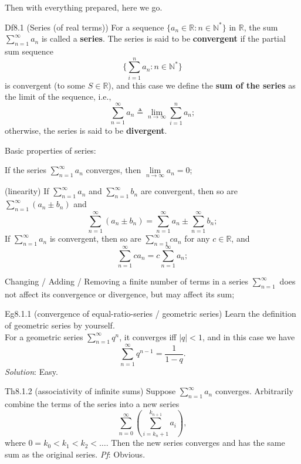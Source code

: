 \documentclass{article}
\begin{document}
Then with everything prepared, here we go. 

\begin{Df}{Df8.1 (Series (of real terms))}
    For a sequence $\{a_n\in\mathbb{R}: n\in\mathbb{N}^\ast\}$ in $\mathbb{R}$, the sum $\sum_{n=1}^{\infty} a_n$ is called a \textbf{series}. The series is said to be \textbf{convergent} if the \textcolor{Df}{partial sum sequence 
    $$ \{\sum_{i=1}^{n} a_n: n\in\mathbb{N}^\ast\} $$}
    is convergent (to some $S\in\mathbb{R}$), and this case we define the \textbf{sum of the series} as the limit of the sequence, i.e.,
    $$ \sum_{n=1}^{\infty} a_n \triangleq \lim_{n\to\infty} \sum_{i=1}^{n} a_n; $$
    otherwise, the series is said to be \textbf{divergent}.
\end{Df}

\begin{Rmk}{}
    \textcolor{Th}{Basic properties of series:
    \begin{compactenum}
        \item If the series $\sum_{n=1}^{\infty} a_n$ converges, then $\lim\limits_{n\to\infty} a_n = 0$;
        \item (linearity) If $\sum_{n=1}^{\infty} a_n$ and $\sum_{n=1}^{\infty} b_n$ are convergent, then so are $\sum_{n=1}^{\infty} (a_n\pm b_n)$ and 
        $$ \sum_{n=1}^{\infty} (a_n\pm b_n) = \sum_{n=1}^{\infty} a_n \pm \sum_{n=1}^{\infty} b_n; $$ If $\sum_{n=1}^{\infty} a_n$ is convergent, then so are $\sum_{n=1}^{\infty} ca_n$ for any $c\in\mathbb{R}$, and 
        $$ \sum_{n=1}^{\infty} ca_n = c\sum_{n=1}^{\infty} a_n; $$ 
        \item Changing / Adding / Removing a finite number of terms in a series $\sum_{n=1}^{\infty}$ does not affect its convergence or divergence, but may affect its sum;
    \end{compactenum}
    }
\end{Rmk}

\begin{Th}{Eg8.1.1 (convergence of equal-ratio-series / geometric series)}
    Learn the definition of geometric series by yourself. \\
    For a geometric series $\sum_{n=1}^{\infty} q^{n}$, it converges iff $|q|<1$, and in this case we have 
    $$ \sum_{n=1}^{\infty} q^{n-1} = \frac{1}{1-q}. $$
    \tcblower
    \textit{Solution}: Easy.
\end{Th}

\begin{Th}{Th8.1.2 (associativity of infinite sums)}
    Suppose $\sum_{n=1}^{\infty} a_n$ converges. Arbitrarily combine the terms of the series into a new series
    $$ \sum_{n=0}^{\infty} \left(\sum_{i = k_n+1}^{k_{n+1}} a_{i}\right), $$
    where $0 = k_0 < k_1 < k_2 < \dots$. Then the new series converges and has the same sum as the original series.
    \tcblower
    \textit{Pf}: Obvious.
\end{Th}
\end{document}
